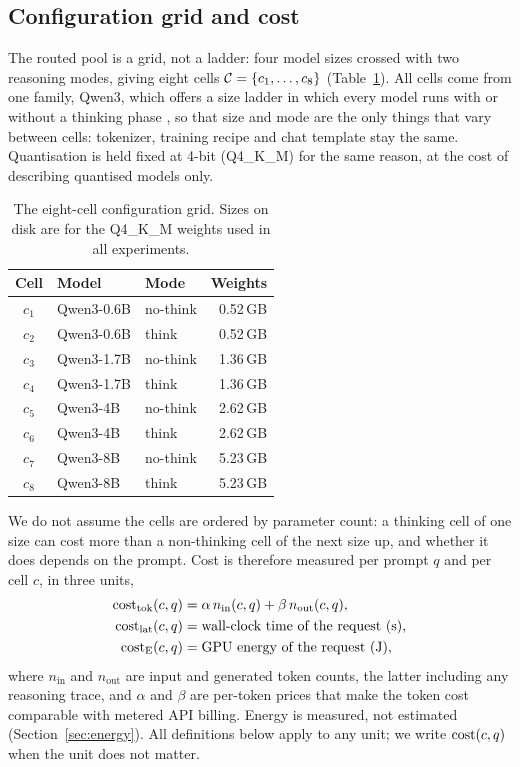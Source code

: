 \subsection{Configuration grid and cost}
\label{sec:grid}

The routed pool is a grid, not a ladder: four model sizes crossed with two
reasoning modes, giving eight cells $\mathcal{C} = \{c_1, \dots, c_8\}$
(Table~\ref{tab:grid}). All cells come from one family, Qwen3, which offers a
size ladder in which every model runs with or without a thinking phase
\cite{qwen3}, so that size and mode are the only things that vary between
cells: tokenizer, training recipe and chat template stay the same.
Quantisation is held fixed at 4-bit (Q4\_K\_M) for the same reason, at the
cost of describing quantised models only.

\begin{table}[ht]
\centering
\caption{The eight-cell configuration grid. Sizes on disk are for the
Q4\_K\_M weights used in all experiments.}
\label{tab:grid}
\begin{tabular}{@{}cllr@{}}
\toprule
Cell & Model & Mode & Weights \\
\midrule
$c_1$ & Qwen3-0.6B & no-think & 0.52\,GB \\
$c_2$ & Qwen3-0.6B & think    & 0.52\,GB \\
$c_3$ & Qwen3-1.7B & no-think & 1.36\,GB \\
$c_4$ & Qwen3-1.7B & think    & 1.36\,GB \\
$c_5$ & Qwen3-4B   & no-think & 2.62\,GB \\
$c_6$ & Qwen3-4B   & think    & 2.62\,GB \\
$c_7$ & Qwen3-8B   & no-think & 5.23\,GB \\
$c_8$ & Qwen3-8B   & think    & 5.23\,GB \\
\bottomrule
\end{tabular}
\end{table}

We do not assume the cells are ordered by parameter count: a thinking cell of
one size can cost more than a non-thinking cell of the next size up, and
whether it does depends on the prompt. Cost is therefore measured per prompt
$q$ and per cell $c$, in three units,
\begin{align}
  \mathrm{cost}_{\mathrm{tok}}(c, q) &= \alpha\, n_{\mathrm{in}}(c, q)
                              + \beta\, n_{\mathrm{out}}(c, q),
  \label{eq:tokcost}\\
  \mathrm{cost}_{\mathrm{lat}}(c, q) &= \text{wall-clock time of the request (s)},
  \label{eq:latcost}\\
  \mathrm{cost}_{\mathrm{E}}(c, q)   &= \text{GPU energy of the request (J)},
  \label{eq:energycost}
\end{align}
where $n_{\mathrm{in}}$ and $n_{\mathrm{out}}$ are input and generated token
counts, the latter including any reasoning trace, and $\alpha$ and $\beta$
are per-token prices that make the token cost comparable with metered API
billing. Energy is measured, not estimated (Section~\ref{sec:energy}). All
definitions below apply to any unit; we write $\mathrm{cost}(c, q)$ when the unit
does not matter.

